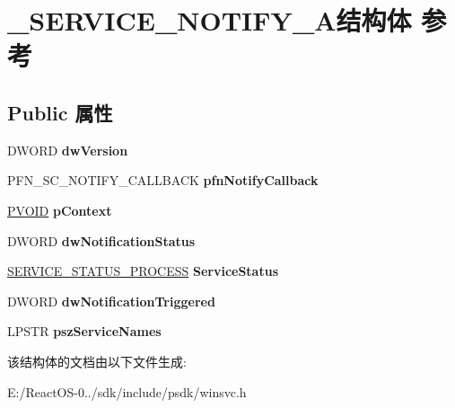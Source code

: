\hypertarget{struct___s_e_r_v_i_c_e___n_o_t_i_f_y__2_a}{}\section{\+\_\+\+S\+E\+R\+V\+I\+C\+E\+\_\+\+N\+O\+T\+I\+F\+Y\+\_\+A结构体 参考}
\label{struct___s_e_r_v_i_c_e___n_o_t_i_f_y__2_a}
\subsection*{Public 属性}
\begin{DoxyCompactItemize}
\item 
\mbox{\label{struct___s_e_r_v_i_c_e___n_o_t_i_f_y__2_a_a4e02b6312684cf3147880f64977d3ce5}} 
D\+W\+O\+RD {\bfseries dw\+Version}
\item 
\mbox{\label{struct___s_e_r_v_i_c_e___n_o_t_i_f_y__2_a_ae4b11c4a6af63a9fec5edd7d676e97f3}} 
P\+F\+N\+\_\+\+S\+C\+\_\+\+N\+O\+T\+I\+F\+Y\+\_\+\+C\+A\+L\+L\+B\+A\+CK {\bfseries pfn\+Notify\+Callback}
\item 
\mbox{\label{struct___s_e_r_v_i_c_e___n_o_t_i_f_y__2_a_ac9a16987afdd43047f3c091f0b5d02f8}} 
\hyperlink{interfacevoid}{P\+V\+O\+ID} {\bfseries p\+Context}
\item 
\mbox{\label{struct___s_e_r_v_i_c_e___n_o_t_i_f_y__2_a_a5a92a76516fdfd0e378dcde6673614a1}} 
D\+W\+O\+RD {\bfseries dw\+Notification\+Status}
\item 
\mbox{\label{struct___s_e_r_v_i_c_e___n_o_t_i_f_y__2_a_a16b0a44db7d401c6c6fa3911b42cb57b}} 
\hyperlink{struct___s_e_r_v_i_c_e___s_t_a_t_u_s___p_r_o_c_e_s_s}{S\+E\+R\+V\+I\+C\+E\+\_\+\+S\+T\+A\+T\+U\+S\+\_\+\+P\+R\+O\+C\+E\+SS} {\bfseries Service\+Status}
\item 
\mbox{\label{struct___s_e_r_v_i_c_e___n_o_t_i_f_y__2_a_aa725e1a75e831fe3aa6844875c31ffe3}} 
D\+W\+O\+RD {\bfseries dw\+Notification\+Triggered}
\item 
\mbox{\label{struct___s_e_r_v_i_c_e___n_o_t_i_f_y__2_a_a411e327c721d0303e20bcc4f71b6eaf3}} 
L\+P\+S\+TR {\bfseries psz\+Service\+Names}
\end{DoxyCompactItemize}


该结构体的文档由以下文件生成\+:\begin{DoxyCompactItemize}
\item 
E\+:/\+React\+O\+S-\/0../sdk/include/psdk/winsvc.\+h\end{DoxyCompactItemize}
